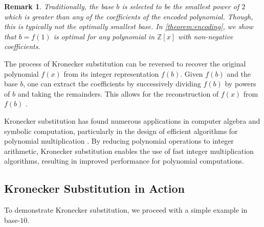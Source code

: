 \documentclass[12pt,reqno]{article}
\theoremstyle{plain}
\newtheorem{remark}{Remark}
\theoremstyle{definition}
\begin{document}
\begin{remark}
Traditionally, the base $b$ is selected to be the smallest power of $2$ which is greater than any of the coefficients of the encoded polynomial. Though, this is typically not the optimally smallest base. In \cref{theorem:encoding}, we show that $b=f(1)$ is optimal for any polynomial in $\mathbb{Z}[x]$ with non-negative coefficients.
\end{remark}

The process of Kronecker substitution can be reversed to recover the original polynomial $f(x)$ from its integer representation $f(b)$. Given $f(b)$ and the base $b$, one can extract the coefficients by successively dividing $f(b)$ by powers of $b$ and taking the remainders. This allows for the reconstruction of $f(x)$ from $f(b)$ \cite{grimaldi2004discrete}.

Kronecker substitution has found numerous applications in computer algebra and symbolic computation, particularly in the design of efficient algorithms for polynomial multiplication \cite{harvey2009kronecker, harvey2014faster}. By reducing polynomial operations to integer arithmetic, Kronecker substitution enables the use of fast integer multiplication algorithms, resulting in improved performance for polynomial computations.

\subsection{Kronecker Substitution in Action}
To demonstrate Kronecker substitution, we proceed with a simple example in base-$10$.
\end{document}
